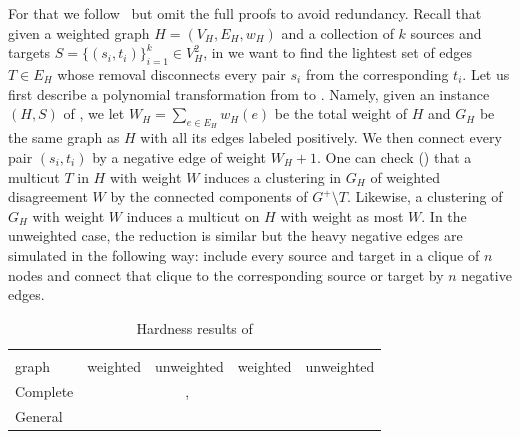 For that we follow~\autocite{Demaine2006} but omit the full proofs to avoid redundancy. Recall that
given a weighted graph $H=(V_H, E_H, w_H)$ and a collection of $k$ sources and targets
$S=\{(s_i,t_i)\}_{i=1}^k \in V_H^2$, in \mmc{} we want to find the lightest set of edges $T\in E_H$
whose removal disconnects every pair $s_i$ from the corresponding $t_i$. Let us first describe a
polynomial transformation from \mmc{} to \pcc{}. Namely, given an instance $(H, S)$ of \mmc{}, we let
$W_H=\sum_{e\in E_H} w_H(e)$ be the total weight of $H$ and $G_H$ be the same graph as $H$ with all
its edges labeled positively. We then connect every pair $(s_i, t_i)$ by a negative edge of weight
$W_H+1$. One can check (\autocite[Theorem 4.7]{Demaine2006}) that a multicut $T$ in $H$ with weight
$W$ induces a clustering in $G_H$ of weighted disagreement $W$ by the connected components of
$G^+\setminus T$. Likewise, a clustering of $G_H$ with weight $W$ induces a multicut on $H$ with
weight as most $W$. In the unweighted case, the reduction is similar but the heavy negative edges
are simulated in the following way: include every source and target in a clique of $n$ nodes and
connect that clique to the corresponding source or target by $n$ negative edges.

\begin{table}[b]
   \centering
   \small
   \caption{Hardness results of \pcc{}} \label{tab:cc_cpx}
   \begin{tabulary}{187mm}{lCCCC}
      \toprule
               &    &                                    \\
      \cmidrule(r){2-3}
      \cmidrule(r){4-5}
      graph    & weighted                      & unweighted                                                     & weighted                                                     & unweighted                   \\
      \midrule
      Complete & \APXh{}~\autocite{Charikar2003} & \NPc{}~\autocite{Bansal2002}, \APXh{}~\autocite{Charikar2003}  &                                                              & \NPc{}~\autocite{Bansal2002} \\
      General  & \APXh{}~\autocites{Charikar2003}{Demaine2003} &  \APXh{}~\autocites{Charikar2003}{Emanuel2003}   &  \\
      \bottomrule
   \end{tabulary}
\end{table}

